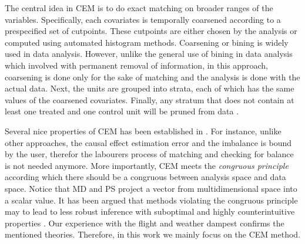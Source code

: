 {{{\vspace{.2cm}
 The central idea in CEM is to do exact matching on
broader ranges of the variables. Specifically, each covariates is temporally coarsened
according to a prespecified set of cutpoints. These cutpoints are either chosen by the analysis or
computed using automated histogram methods. Coarsening or bining is widely used in data analysis. However,
unlike the general use of bining in data analysis which involved with permanent removal of information, in this
approach, coarsening is done only for the sake of matching and the analysis is done with the
 actual data.   Next, the units are grouped into strata, each of which has the same values of the
 coarsened covariates. Finally, any stratum that does not contain at least one treated and
 one control unit will be pruned from data \cite{IacKinPor09}.

Several nice properties of CEM has been established in \cite{IacKinPor09}. For instance, unlike other
 approaches, the causal effect estimation error and the imbalance is bound by the user, therefor
  the labourers process of matching and checking for balance is not needed anymore. More
   importantly, CEM meets the {\em congruous principle} according
   which there should be a congruous between analysis space
   and data space. Notice that MD and PS project a vector from
    multidimensional space into a scalar value. It has been argued that methods violating the congruous principle
    may to lead to less robust inference with suboptimal and highly counterintuitive
     properties \cite{IacKinPor09}. Our experience with the flight and weather
     dampest confirms the mentioned theories. Therefore, in this work we mainly focus on the CEM method.











}}}
